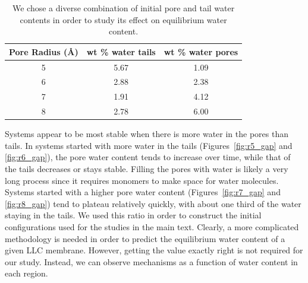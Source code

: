 \documentclass{article}
\begin{document}
  \begin{table}[!htb]
  \centering
  \begin{tabular}{|c|c|c|}
  \hline
  Pore Radius (\AA) & wt \% water tails & wt \% water pores \\
  \hline
  5                 &        5.67       &     1.09          \\
  6                 &        2.88       &     2.38          \\
  7                 &        1.91       &     4.12          \\
  8                 &        2.78       &     6.00          \\
  \hline
  \end{tabular}
  \caption{We chose a diverse combination of initial pore and tail water
	  contents in order to study its effect on equilibrium water
	  content.}\label{table:water_content}
  \end{table}

  Systems appear to be most stable when there is more water in the pores than
  tails. In systems started with more water in the tails
  (Figures~\ref{fig:r5_gap} and \ref{fig:r6_gap}), the pore water content tends
  to increase over time, while that of the tails decreases or stays stable.
  Filling the pores with water is likely a very long process since it requires
  monomers to make space for water molecules. Systems started with a higher pore
  water content (Figures~\ref{fig:r7_gap} and \ref{fig:r8_gap}) tend to plateau
  relatively quickly, with about one third of the water staying in the tails.  We
  used this ratio in order to construct the initial configurations used for the
  studies in the main text.  Clearly, a more complicated methodology is needed in
  order to predict the equilibrium water content of a given LLC membrane.
  However, getting the value exactly right is not required for our study.
  Instead, we can observe mechanisms as a function of water content in each
  region. 
\end{document}
